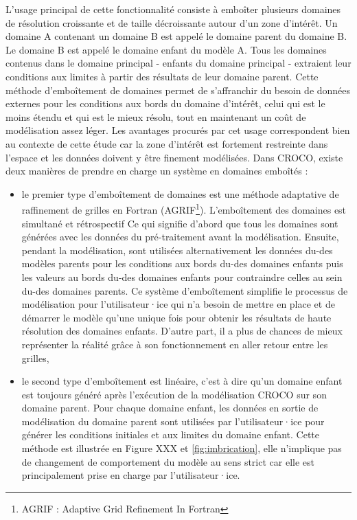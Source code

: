 \documentclass[10pt,a4paper,titlepage]{article}
\begin{document}
L'usage principal de cette fonctionnalité consiste à emboîter plusieurs domaines de résolution croissante et de taille décroissante autour d'un zone d'intérêt.
Un domaine A contenant un domaine B est appelé le domaine parent du domaine B.
Le domaine B est appelé le domaine enfant du modèle A.
Tous les domaines contenus dans le domaine principal - enfants du domaine principal - extraient leur conditions aux limites à partir des résultats de leur domaine parent.
Cette méthode d'emboîtement de domaines permet de s'affranchir du besoin de données externes pour les conditions aux bords du domaine d'intérêt, celui qui est le moins étendu et qui est le mieux résolu, tout en maintenant un coût de modélisation assez léger.
Les avantages procurés par cet usage correspondent bien au contexte de cette étude car la zone d'intérêt est fortement restreinte dans l'espace et les données doivent y être finement modélisées.
Dans CROCO, existe deux manières de prendre en charge un système en domaines emboîtés :
\begin{itemize}
    \item le premier type d'emboîtement de domaines est une méthode adaptative de raffinement de grilles en Fortran (AGRIF\footnote{AGRIF : Adaptive Grid Refinement In Fortran}).
    L'emboîtement des domaines est simultané et rétrospectif
    Ce qui signifie d'abord que tous les domaines sont générées avec les données du pré-traitement avant la modélisation.
    Ensuite, pendant la modélisation, sont utilisées alternativement les données du-des modèles parents pour les conditions aux bords du-des domaines enfants puis les valeurs au bords du-des domaines enfants pour contraindre celles au sein du-des domaines parents.
    Ce système d'emboîtement simplifie le processus de modélisation pour l'utilisateur·ice qui n'a besoin de mettre en place et de démarrer le modèle qu'une unique fois pour obtenir les résultats de haute résolution des domaines enfants.
    D'autre part, il a plus de chances de mieux représenter la réalité grâce à son fonctionnement en aller retour entre les grilles,
    \item le second type d'emboîtement est linéaire, c'est à dire qu'un domaine enfant est toujours généré après l'exécution de la modélisation CROCO sur son domaine parent.
    Pour chaque domaine enfant, les données en sortie de modélisation du domaine parent sont utilisées par l'utilisateur·ice pour générer les conditions initiales et aux limites du domaine enfant.
    Cette méthode est illustrée en Figure XXX et \ref{fig:imbrication}, elle n'implique pas de changement de comportement du modèle au sens strict car elle est principalement prise en charge par l'utilisateur·ice.
\end{itemize}
\end{document}
